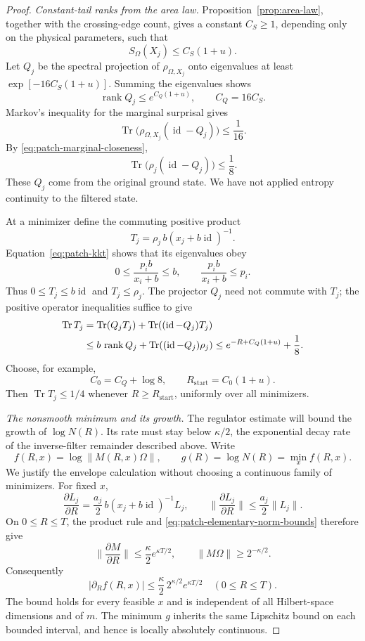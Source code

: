\documentclass[11pt]{article}
\numberwithin{equation}{section}
\theoremstyle{definition}
\theoremstyle{remark}
\DeclareMathOperator{\Tr}{Tr}
\DeclareMathOperator{\rank}{rank}
\DeclareMathOperator{\id}{id}
\newcommand{\norm}[1]{\lVert #1\rVert}
\newcommand{\abs}[1]{\lvert #1\rvert}
\begin{document}
\begin{proof}
\emph{Constant-tail ranks from the area law.}
Proposition~\ref{prop:area-law}, together with the crossing-edge
count, gives a constant \(C_S\geq1\), depending only on the physical
parameters, such that
\[
 S_\Omega(X_j)\leq C_S(1+u).
\]
Let \(Q_j\) be the spectral projection of \(\rho_{\Omega,X_j}\)
onto eigenvalues at least
\(\exp[-16C_S(1+u)]\).  Summing the eigenvalues shows
\[
 \rank Q_j\leq e^{C_Q(1+u)},\qquad C_Q=16C_S.
\]
Markov's inequality for the marginal surprisal gives
\[
 \Tr\bigl(\rho_{\Omega,X_j}(\id-Q_j)\bigr)
       \leq\frac1{16}.
\]
By \eqref{eq:patch-marginal-closeness},
\begin{equation}
 \Tr\bigl(\rho_j(\id-Q_j)\bigr)\leq\frac18.
 \label{eq:patch-constant-tail}
\end{equation}
These \(Q_j\) come from the original ground state.  We have not
applied entropy continuity to the filtered state.

At a minimizer define the commuting positive product
\[
 T_j=\rho_j\,b(x_j+b\id)^{-1}.
\]
Equation~\eqref{eq:patch-kkt} shows that its eigenvalues obey
\[
 0\leq \frac{p_i b}{x_i+b}\leq b,
 \qquad
 \frac{p_i b}{x_i+b}\leq p_i.
\]
Thus \(0\leq T_j\leq b\id\) and \(T_j\leq\rho_j\).
The projector \(Q_j\) need not commute with \(T_j\); the positive
operator inequalities suffice to give
\begin{align}
 \Tr T_j
 &=\Tr(Q_jT_j)+\Tr((\id-Q_j)T_j) \notag\\
 &\leq b\,\rank Q_j+
          \Tr((\id-Q_j)\rho_j)
 \leq e^{-R+C_Q(1+u)}+\frac18.
 \label{eq:patch-regulator-trace}
\end{align}
Choose, for example,
\[
 C_0=C_Q+\log8,\qquad R_{\mathrm{start}}=C_0(1+u).
\]
Then \(\Tr T_j\leq1/4\) whenever \(R\geq R_{\mathrm{start}}\),
uniformly over all minimizers.

\emph{The nonsmooth minimum and its growth.}
The regulator estimate will bound the growth of $\log N(R)$.  Its rate
must stay below $\kappa/2$, the exponential decay rate of the
inverse-filter remainder described above.  Write
\[
 f(R,x)=\log\norm{M(R,x)\Omega},
 \qquad g(R)=\log N(R)=\min_x f(R,x).
\]
We justify the envelope calculation without choosing a continuous
family of minimizers.  For fixed \(x\),
\[
 \frac{\partial L_j}{\partial R}
       =\frac{a_j}{2}\,b(x_j+b\id)^{-1}L_j,
 \qquad
 \norm{\frac{\partial L_j}{\partial R}}
       \leq\frac{a_j}{2}\norm{L_j}.
\]
On \(0\leq R\leq T\), the product rule and
\eqref{eq:patch-elementary-norm-bounds} therefore give
\[
 \norm{\frac{\partial M}{\partial R}}
       \leq\frac{\kappa}{2}e^{\kappa T/2},
 \qquad
 \norm{M\Omega}\geq2^{-\kappa/2}.
\]
Consequently
\begin{equation}
 \abs{\partial_R f(R,x)}
       \leq \frac{\kappa}{2}\,2^{\kappa/2}e^{\kappa T/2}
       \quad(0\leq R\leq T).
 \label{eq:patch-uniform-local-lipschitz}
\end{equation}
The bound holds for every feasible \(x\) and is independent of all
Hilbert-space dimensions and of \(m\).  The minimum \(g\) inherits
the same Lipschitz bound on each bounded interval, and hence is
locally absolutely continuous.


\end{proof}
\end{document}
